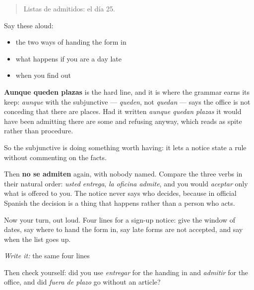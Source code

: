 \begin{quote}
Listas de admitidos: el día 25.
\end{quote}

Say these aloud:

\begin{itemize}
\raggedright
  \item the two ways of handing the form in
  \item what happens if you are a day late
  \item when you find out
\end{itemize}

\begin{culture}
\textbf{Aunque queden plazas} is the hard line, and it is where the grammar earns its keep: \emph{aunque} with the subjunctive — \emph{queden}, not \emph{quedan} — says the office is not conceding that there are places. Had it written \emph{aunque quedan plazas} it would have been admitting there are some and refusing anyway, which reads as spite rather than procedure.

So the subjunctive is doing something worth having: it lets a notice state a rule without commenting on the facts.

Then \textbf{no se admiten} again, with nobody named. Compare the three verbs in their natural order: \emph{usted entrega}, \emph{la oficina admite}, and you would \emph{aceptar} only what is offered to you. The notice never says who decides, because in official Spanish the decision is a thing that happens rather than a person who acts.
\end{culture}

\begin{tcolorbox}[breakable,colback=teal!4,colframe=teal!35!black,title={Before you move on}]
Now your turn, out loud. Four lines for a sign-up notice: give the window of dates, say where to hand the form in, say late forms are not accepted, and say when the list goes up.

\emph{Write it:} the same four lines

Then check yourself: did you use \emph{entregar} for the handing in and \emph{admitir} for the office, and did \emph{fuera de plazo} go without an article?
\end{tcolorbox}
